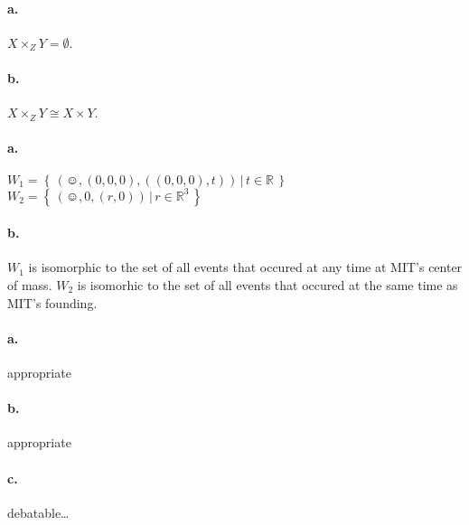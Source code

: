 \paragraph{a.}
$X \times_Z Y = \emptyset$.
\paragraph{b.}
$X \times_Z Y \cong X \times Y$.


\paragraph{a.}
$W_1 = \left\{\,\left(\smiley,(0,0,0),((0,0,0),t)\right)\,\vert\,t\in\mathbb{R}\,\right\}$
$W_2 = \left\{\,\left(\smiley,0,(r,0)\right)\,\vert\,r\in\mathbb{R}^3\,\right\}$
\paragraph{b.}
$W_1$ is isomorphic to the set of all events that occured at any time
at MIT's center of mass.  $W_2$ is isomorhic to the set of all events
that occured at the same time as MIT's founding.


\paragraph{a.}
appropriate
\paragraph{b.}
appropriate
\paragraph{c.}
debatable\ldots


